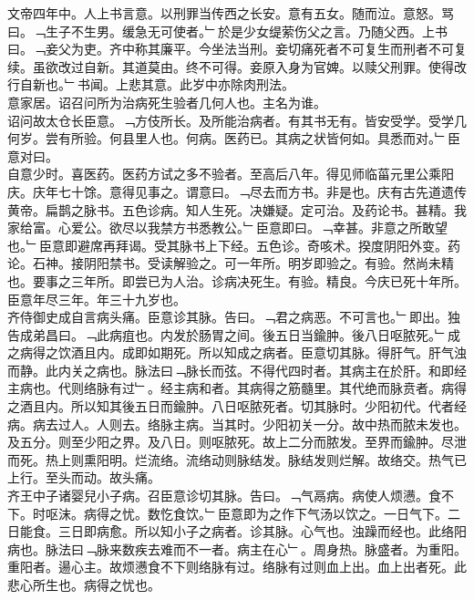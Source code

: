 \documentclass{zhvt-classic}
\begin{document}
\hspace*{2em}文帝四年中。人上书言意。以刑罪当传西之长安。意有五女。随而泣。意怒。骂曰。﹁生子不生男。缓急无可使者。﹂於是少女缇萦伤父之言。乃随父西。上书曰。﹁妾父为吏。齐中称其廉平。今坐法当刑。妾切痛死者不可复生而刑者不可复续。虽欲改过自新。其道莫由。终不可得。妾原入身为官婢。以赎父刑罪。使得改行自新也。﹂书闻。上悲其意。此岁中亦除肉刑法。\\
\hspace*{2em}意家居。诏召问所为治病死生验者几何人也。主名为谁。\\
\hspace*{2em}诏问故太仓长臣意。﹁方伎所长。及所能治病者。有其书无有。皆安受学。受学几何岁。尝有所验。何县里人也。何病。医药已。其病之状皆何如。具悉而对。﹂臣意对曰。\\
\hspace*{2em}自意少时。喜医药。医药方试之多不验者。至高后八年。得见师临菑元里公乘阳庆。庆年七十馀。意得见事之。谓意曰。﹁尽去而方书。非是也。庆有古先道遗传黄帝。扁鹊之脉书。五色诊病。知人生死。决嫌疑。定可治。及药论书。甚精。我家给富。心爱公。欲尽以我禁方书悉教公。﹂臣意即曰。﹁幸甚。非意之所敢望也。﹂臣意即避席再拜谒。受其脉书上下经。五色诊。奇咳术。揆度阴阳外变。药论。石神。接阴阳禁书。受读解验之。可一年所。明岁即验之。有验。然尚未精也。要事之三年所。即尝已为人治。诊病决死生。有验。精良。今庆已死十年所。臣意年尽三年。年三十九岁也。\\
\hspace*{2em}齐侍御史成自言病头痛。臣意诊其脉。告曰。﹁君之病恶。不可言也。﹂即出。独告成弟昌曰。﹁此病疽也。内发於肠胃之间。後五日当鍮肿。後八日呕脓死。﹂成之病得之饮酒且内。成即如期死。所以知成之病者。臣意切其脉。得肝气。肝气浊而静。此内关之病也。脉法曰﹁脉长而弦。不得代四时者。其病主在於肝。和即经主病也。代则络脉有过﹂。经主病和者。其病得之筋髓里。其代绝而脉贲者。病得之酒且内。所以知其後五日而鍮肿。八日呕脓死者。切其脉时。少阳初代。代者经病。病去过人。人则去。络脉主病。当其时。少阳初关一分。故中热而脓未发也。及五分。则至少阳之界。及八日。则呕脓死。故上二分而脓发。至界而鍮肿。尽泄而死。热上则熏阳明。烂流络。流络动则脉结发。脉结发则烂解。故络交。热气已上行。至头而动。故头痛。\\
\hspace*{2em}齐王中子诸婴兒小子病。召臣意诊切其脉。告曰。﹁气鬲病。病使人烦懑。食不下。时呕沫。病得之忧。数忔食饮。﹂臣意即为之作下气汤以饮之。一日气下。二日能食。三日即病愈。所以知小子之病者。诊其脉。心气也。浊躁而经也。此络阳病也。脉法曰﹁脉来数疾去难而不一者。病主在心﹂。周身热。脉盛者。为重阳。重阳者。逿心主。故烦懑食不下则络脉有过。络脉有过则血上出。血上出者死。此悲心所生也。病得之忧也。\\
\end{document}
